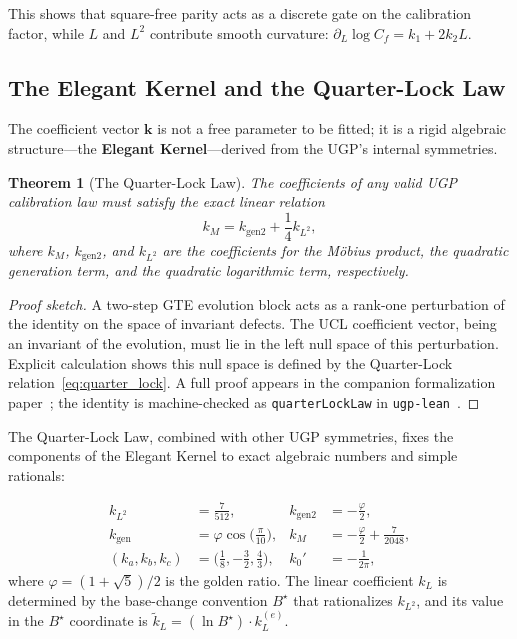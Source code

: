 \documentclass[11pt]{article}
\newtheorem{theorem}{Theorem}[section]
\theoremstyle{remark}
\newcommand{\Cf}{C_{\!f}}
\begin{document}
This shows that square-free parity acts as a discrete gate on the calibration factor, while $L$ and $L^2$ contribute smooth curvature: $\partial_L \log \Cf = k_1 + 2k_2 L$.


\subsection{The Elegant Kernel and the Quarter-Lock Law}
\label{subsec:kernel}

The coefficient vector $\mathbf{k}$ is not a free parameter to be fitted; it is a rigid algebraic structure---the \textbf{Elegant Kernel}---derived from the UGP's internal symmetries.

\begin{theorem}[The Quarter-Lock Law]
\label{thm:quarter_lock}
The coefficients of any valid UGP calibration law must satisfy the exact linear relation
\begin{equation}
k_M = k_{\mathrm{gen2}} + \frac{1}{4} k_{L^2},
\label{eq:quarter_lock}
\end{equation}
where $k_M$, $k_{\mathrm{gen2}}$, and $k_{L^2}$ are the coefficients for the M\"obius product, the quadratic generation term, and the quadratic logarithmic term, respectively.
\end{theorem}

\begin{proof}[Proof sketch]
A two-step GTE evolution block acts as a rank-one perturbation of the identity on the space of invariant defects.
The UCL coefficient vector, being an invariant of the evolution, must lie in the left null space of this perturbation.
Explicit calculation shows this null space is defined by the Quarter-Lock relation~\eqref{eq:quarter_lock}.
A full proof appears in the companion formalization paper~\cite{SpivackUGPFormalization}; the identity is machine-checked as \texttt{quarterLockLaw} in \texttt{ugp-lean}~\cite{ugp-lean}.
\end{proof}

The Quarter-Lock Law, combined with other UGP symmetries, fixes the components of the Elegant Kernel to exact algebraic numbers and simple rationals:

\begin{tcolorbox}[colback=yellow!5,colframe=yellow!75!black,title=\textbf{The Elegant Kernel}]
\begin{equation}
\boxed{\;\begin{aligned}
k_{L^2} &= \tfrac{7}{512}, & k_{\mathrm{gen2}} &= -\tfrac{\varphi}{2}, \\
k_{\mathrm{gen}} &= \varphi\cos\!\bigl(\tfrac{\pi}{10}\bigr), & k_M &= -\tfrac{\varphi}{2} + \tfrac{7}{2048}, \\
(k_a, k_b, k_c) &= \bigl(\tfrac{1}{8}, -\tfrac{3}{2}, \tfrac{4}{3}\bigr), & k_0' &= -\tfrac{1}{2\pi},
\end{aligned}\;}
\label{eq:kernel}
\end{equation}
where $\varphi = (1 + \sqrt{5})/2$ is the golden ratio.
The linear coefficient $k_L$ is determined by the base-change convention $B^\star$ that rationalizes $k_{L^2}$, and its value in the $B^\star$ coordinate is $\tilde{k}_L = (\ln B^\star) \cdot k_L^{(e)}$.
\end{tcolorbox}
\end{document}
